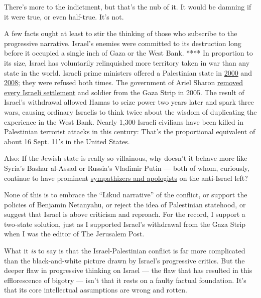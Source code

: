 There's more to the indictment, but that's the nub of it. It would be
damning if it were true, or even half-true. It's not.

A few facts ought at least to stir the thinking of those who subscribe
to the progressive narrative. Israel's enemies were committed to its
destruction long before it occupied a single inch of Gaza or the West
Bank. **** In proportion to its size, Israel has voluntarily
relinquished more territory taken in war than any state in the world.
Israeli prime ministers offered a Palestinian state in
\href{https://www.theguardian.com/world/2002/may/23/israel3}{2000} and
\href{https://www.haaretz.com/1.5014018}{2008}; they were refused both
times. The government of Ariel Sharon
\href{https://www.nytimes3xbfgragh.onion/2005/08/18/world/middleeast/tearfully-but-forcefully-israel-removes-gaza-settlers.html}{removed
every Israeli settlement} and soldier from the Gaza Strip in 2005. The
result of Israel's withdrawal allowed Hamas to seize power two years
later and spark three wars, causing ordinary Israelis to think twice
about the wisdom of duplicating the experience in the West Bank. Nearly
1,300 Israeli civilians have been killed in Palestinian terrorist
attacks in this century: That's the proportional equivalent of about 16
Sept. 11's in the United States.

Also: If the Jewish state is really so villainous, why doesn't it behave
more like Syria's Bashar al-Assad or Russia's Vladimir Putin --- both of
whom, curiously, continue to have prominent
\href{https://www.haaretz.com/opinion/as-trump-shores-up-assad-regime-u-s-hard-left-cheers-him-on-1.5431962}{sympathizers
and apologists} on the anti-Israel left?

None of this is to embrace the ``Likud narrative'' of the conflict, or
support the policies of Benjamin Netanyahu, or reject the idea of
Palestinian statehood, or suggest that Israel is above criticism and
reproach. For the record, I support a two-state solution, just as I
supported Israel's withdrawal from the Gaza Strip when I was the editor
of The Jerusalem Post.

What it \emph{is} to say is that the Israel-Palestinian conflict is far
more complicated than the black-and-white picture drawn by Israel's
progressive critics. But the deeper flaw in progressive thinking on
Israel --- the flaw that has resulted in this efflorescence of bigotry
--- isn't that it rests on a faulty factual foundation. It's that its
core intellectual assumptions are wrong and rotten.

